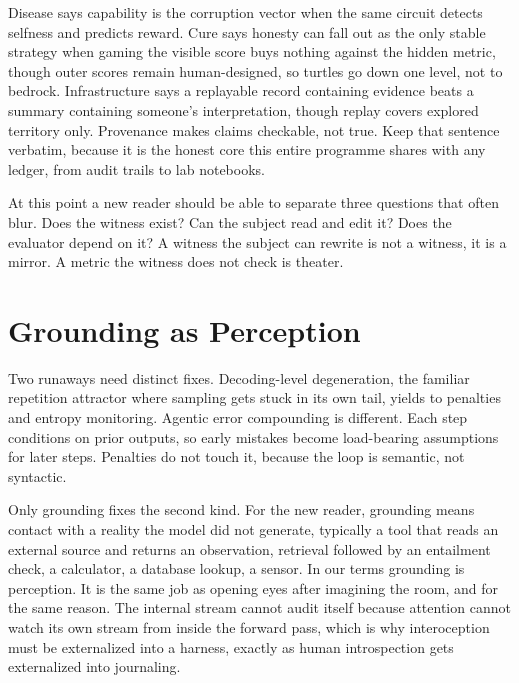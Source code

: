 Disease says capability is the corruption vector when the same circuit detects selfness and predicts reward. Cure says honesty can fall out as the only stable strategy when gaming the visible score buys nothing against the hidden metric, though outer scores remain human-designed, so turtles go down one level, not to bedrock. Infrastructure says a replayable record containing evidence beats a summary containing someone's interpretation, though replay covers explored territory only. Provenance makes claims checkable, not true. Keep that sentence verbatim, because it is the honest core this entire programme shares with any ledger, from audit trails to lab notebooks.

At this point a new reader should be able to separate three questions that often blur. Does the witness exist? Can the subject read and edit it? Does the evaluator depend on it? A witness the subject can rewrite is not a witness, it is a mirror. A metric the witness does not check is theater.

\section{Grounding as Perception}
\label{sec:ch09-grounding}

Two runaways need distinct fixes. Decoding-level degeneration, the familiar repetition attractor where sampling gets stuck in its own tail, yields to penalties and entropy monitoring. Agentic error compounding is different. Each step conditions on prior outputs, so early mistakes become load-bearing assumptions for later steps. Penalties do not touch it, because the loop is semantic, not syntactic.

Only grounding fixes the second kind. For the new reader, grounding means contact with a reality the model did not generate, typically a tool that reads an external source and returns an observation, retrieval followed by an entailment check, a calculator, a database lookup, a sensor. In our terms grounding is perception. It is the same job as opening eyes after imagining the room, and for the same reason. The internal stream cannot audit itself because attention cannot watch its own stream from inside the forward pass, which is why interoception must be externalized into a harness, exactly as human introspection gets externalized into journaling.

